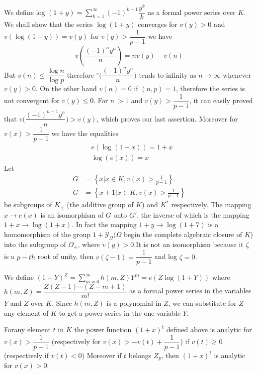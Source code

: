 We define log $(1+y)=\sum\limits^\infty_{k=1}(-1)^{k-1}\dfrac{y^k}{k}$
as a formal power series over $K$. We shall show that the series
$\log(1+y)$ converges for $v(y)>0$ and\pageoriginale $v(\log (1+y))=v(y)$ for  $v(y)
>\dfrac{1}{p-1}$ 
we have 
$$
v \left(\frac{(-1)^ny^n}{n}\right)= n v(y)-v(n)
$$
But $v(n)\leq \dfrac{\log n}{\log p} $ therefore
$^v\bigg(\dfrac{(-1)^ny^n}{n}\bigg)$ tends to infinity as $n\to\infty$
whenever $v(y)>0$. On the other hand $v(n)=0$ if $(n,p)=1$, therefore
the series is not convergent for $v(y)\leq 0$. For $n~ >1$ and
$v(y)>\dfrac{1}{p-1}$, it can easily proved that
$v\bigg(\dfrac{(-1)^{n-1}y^n}{n}\bigg)>v(y)$, which proves our last
assertion. Moreover for $v(x)>\dfrac{1}{p-1}$ we have the equalities 
\begin{align*}
  & e(\log(1+x))=1+x \tag{1}\label{part3:chap1:sec4:eq1}\\
  & \log(e(x))= x\tag{2}\label{part3:chap1:sec4:eq2}
\end{align*}
Let
\begin{align*}
  G &= \left\{ x|x \in K, v(x) > \frac{1}{p-1}\right\}\\
  G &= \left\{ x + 1| x\in K, v(x)>\frac{1}{p-1}\right\}
\end{align*}
be subgroups of $K_+$ (the additive group of $K$) and $K^\ast$
respectively. The
mapping $x\to e(x)$ is an isomorphism of $G$ onto $G'$, the inverse
of which  is the mapping $1+x\to\log(1+x)$. In fact the mapping
$1+y\to\log (1+7)$ is a homomorphism of the group
$1+\mathscr{Y}_\Omega(\Omega$ begin the complete algebraic closure of
$K$) into the subgroup of $\Omega_+$, where $v(y)>0$.It is not an
isomorphism because it $\zeta$ is a $p-th$ root of unity, then
$v(\zeta-1)=\dfrac{1}{p-1}$ and log $\zeta=0$. 

We define $(1+Y)^Z=\sum\limits^\infty_{m=0}h(m,Z)Y^m=e(Z \log(1+Y))$
where\break $h(m,Z)=\dfrac{Z(Z-1)\cdots(Z-m+1)}{m!}$ as a formal power
series in the variables $Y$ and $Z$ over $K$. Since $h(m,Z)$ is a
polynomial in $Z$, we can substitute for $Z$ any element of $K$ to
get a power series in the one variable $Y$.  

\begin{proposition}\label{part3:chap1:sec4:prop4}
  For\pageoriginale any element $t$ in $K$ the power function $(1+x)^t$ defined
  above is analytic for $v(x)>\dfrac{1}{p-1}$ (respectively for
  $v(x)>-v(t)+\dfrac{1}{p-1}$) if $v(t) \geq 0$ (respectively if
  $v(t)<0$) Moreover if $t$ belongs 
  $Z_p$, then $(1+x)^t$ is analytic for $v(x)>0$. 
\end{proposition}

